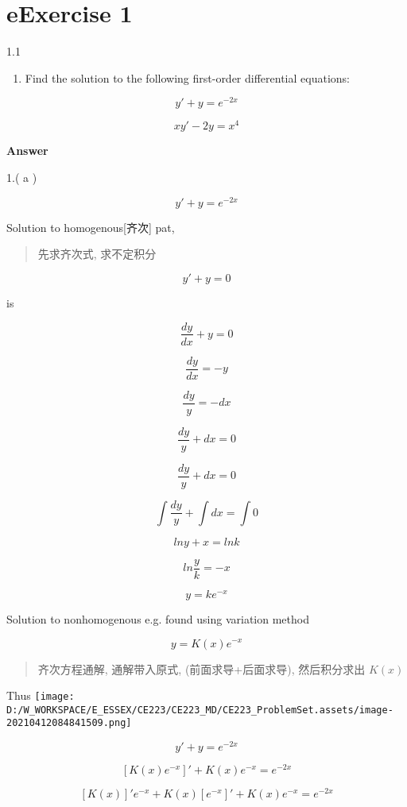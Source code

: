 \documentclass[
]{article}
\author{}
\date{}
\begin{document}
\hypertarget{header-n0}{%
\section{eExercise 1}\label{header-n0}}

1.1

\begin{enumerate}
\def\labelenumi{\arabic{enumi}.}
\item
  Find the solution to the following first-order differential equations:
\end{enumerate}

\[y'+y = e^{-2x}\]

\[xy'-2y = x^4\]

\textbf{Answer}

1.( a )

\[y' + y = e^{-2x}\]

Solution to homogenous{[}齐次{]} pat,

\begin{quote}
先求齐次式, 求不定积分
\end{quote}

\[y'+y=0\]

is

\[\frac{dy}{dx} + y =0\]

\[\frac{dy}{dx} =- y\]

\[\frac{dy}{y} =- dx\]

\[\frac{dy}{y} + dx =0\]

\[\frac{dy}{y}+dx = 0\]

\[\int {\frac{dy}{y}} + \int dx = \int0\]

\[lny+x=lnk\]

\[ln\frac{y}{k}=-x\]

\[y=ke^{-x}\]

Solution to nonhomogenous e.g. found using variation method

\[y = K(x)e^{-x}\]

\begin{quote}
齐次方程通解, 通解带入原式, (前面求导+后面求导), 然后积分求出 \(K(x)\)
\end{quote}

Thus
\texttt{[image: D:/W\_WORKSPACE/E\_ESSEX/CE223/CE223\_MD/CE223\_ProblemSet.assets/image-20210412084841509.png]}

\[y' + y = e^{-2x}\]

\[[K(x)e^{-x}]' + K(x)e^{-x} = e^{-2x}\]

\[[K(x)]'e^{-x} + K(x)[e^{-x}]'  + K(x)e^{-x} = e^{-2x}\]
\end{document}
